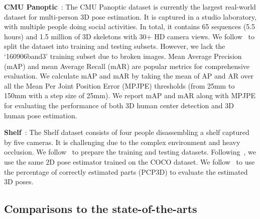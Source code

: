 \documentclass[10pt,twocolumn,letterpaper]{article}
\begin{document}
\textbf{CMU Panoptic}~\cite{joo2017panoptic}:
The CMU Panoptic dataset is currently the largest real-world dataset for multi-person 3D pose estimation. It is captured in a studio laboratory, with multiple people doing social activities. In total, it contains 65 sequences (5.5 hours) and 1.5 million of 3D skeletons with 30+ HD camera views. We follow~\cite{tu2020voxelpose,xiang2019monocular} to split the dataset into training and testing subsets. However, we lack the `160906band3' training subset due to broken images. Mean Average Precision (mAP) and mean Average Recall (mAR) are popular metrics for comprehensive evaluation. We calculate mAP and mAR by taking the mean of AP and AR over all the Mean Per Joint Position Error (MPJPE) thresholds (from 25mm to 150mm with a step size of 25mm). We report mAP and mAR along with MPJPE for evaluating the performance of both 3D human center detection and 3D human pose estimation.

\textbf{Shelf}~\cite{belagiannis20143d}:
The Shelf dataset consists of four people disassembling a shelf captured by five cameras. It is challenging due to the complex environment and heavy occlusion. We follow~\cite{belagiannis20143d,dong2019fast,tu2020voxelpose} to prepare the training and testing datasets. Following~\cite{tu2020voxelpose}, we use the same 2D pose estimator trained on the COCO dataset. We follow~\cite{belagiannis20143d,belagiannis20153d,belagiannis2014multiple,dong2019fast,ershadi2018multiple} to use the percentage of correctly estimated parts (PCP3D) to evaluate the estimated 3D poses.

\subsection{Comparisons to the state-of-the-arts}

\begin{table}[h]
    \centering
    \caption{Comparisons to the state-of-the-art approaches on CMU Panoptic dataset~\cite{joo2017panoptic}. The symbol  means that the higher score the better, while  means that the lower the better. `*' indicates the mean value of four AP metrics reported in~\cite{tu2020voxelpose, lin2021multi}. `' indicates that better 2D pose estimator~\cite{sun2019deep} is used.}
    \label{tab:compare_panoptic}
\end{table}
\end{document}
